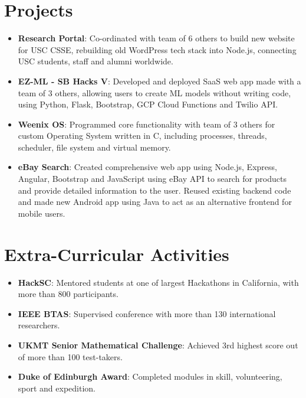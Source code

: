 \documentclass[letterpaper,11pt]{article}
\newcommand{\resumeItem}[2]{
  \item\small{
    \textbf{#1}{: #2 \vspace{-2pt}}
  }
}
\newcommand{\resumeSubItem}[2]{\resumeItem{#1}{#2}\vspace{-4pt}}
\newcommand{\resumeSubHeadingListStart}{\begin{itemize}[leftmargin=*]}
\newcommand{\resumeSubHeadingListEnd}{\end{itemize}}
\begin{document}
\section{Projects}
  \resumeSubHeadingListStart
    \resumeSubItem{Research Portal}
      {Co-ordinated with team of 6 others to build new website for USC CSSE, rebuilding old WordPress tech stack into Node.js, connecting USC students, staff and alumni worldwide.}
    \resumeSubItem{EZ-ML - SB Hacks V}
      {Developed and deployed SaaS web app made with a team of 3 others, allowing users to create ML models without writing code, using Python, Flask, Bootstrap, GCP Cloud Functions and Twilio API.}
    \resumeSubItem{Weenix OS}
      {Programmed core functionality with team of 3 others for custom Operating System written in C, including processes, threads, scheduler, file system and virtual memory.}
    \resumeSubItem{eBay Search}
      {Created comprehensive web app using Node.js, Express, Angular, Bootstrap and JavaScript using eBay API to search for products and provide detailed information to the user. Reused existing backend code and made new Android app using Java to act as an alternative frontend for mobile users.}
  \resumeSubHeadingListEnd


\section{Extra-Curricular Activities}
  \resumeSubHeadingListStart
    \resumeSubItem{HackSC}
      {Mentored students at one of largest Hackathons in California, with more than 800 participants.}
    \resumeSubItem{IEEE BTAS}
      {Supervised conference with more than 130 international researchers.}
    \resumeSubItem{UKMT Senior Mathematical Challenge}
      {Achieved 3rd highest score out of more than 100 test-takers.}
    \resumeSubItem{Duke of Edinburgh Award}
      {Completed modules in skill, volunteering, sport and expedition.}
  \resumeSubHeadingListEnd
\end{document}
